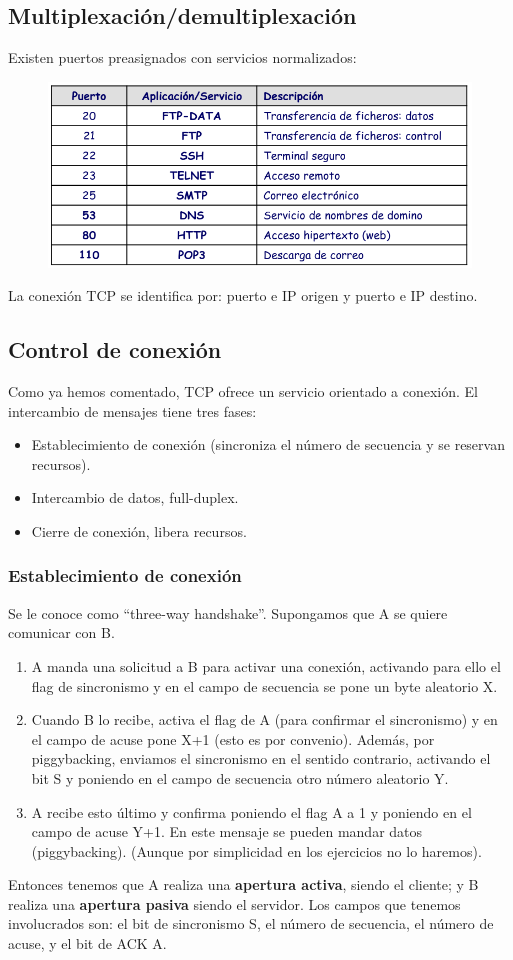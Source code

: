 \subsection{Multiplexación/demultiplexación}
Existen puertos preasignados con servicios normalizados:
\begin{figure}[H]
    \centering
    \includegraphics[width=0.6\linewidth]{./images/puertos-tcp.png}
\end{figure}

La conexión TCP se identifica por: puerto e IP origen y puerto e IP destino.
\subsection{Control de conexión}
Como ya hemos comentado, TCP ofrece un servicio orientado a conexión. El intercambio de mensajes tiene tres fases:
\begin{itemize}
    \item Establecimiento de conexión (sincroniza el número de secuencia y se reservan recursos).
    \item Intercambio de datos, full-duplex.
    \item Cierre de conexión, libera recursos.
\end{itemize}

\subsubsection{Establecimiento de conexión}
Se le conoce como ``three-way handshake''. Supongamos que A se quiere comunicar con B. 
\begin{enumerate}
    \item A manda una solicitud a B para activar una conexión, activando para ello el flag de sincronismo y en el campo de secuencia se pone un byte aleatorio X.
    \item Cuando B lo recibe, activa el flag de A (para confirmar el sincronismo) y en el campo de acuse pone X+1 (esto es por convenio). Además, por piggybacking, enviamos el sincronismo en el sentido contrario, activando el bit S y poniendo en el campo de secuencia otro número aleatorio Y.
    \item A recibe esto último y confirma poniendo el flag A a 1 y poniendo en el campo de acuse Y+1. En este mensaje se pueden mandar datos (piggybacking). (Aunque por simplicidad en los ejercicios no lo haremos).
\end{enumerate}
Entonces tenemos que A realiza una \textbf{apertura activa}, siendo el cliente; y B realiza una \textbf{apertura pasiva} siendo el servidor. Los campos que tenemos involucrados son: el bit de sincronismo S, el número de secuencia, el número de acuse, y el bit de ACK A.


